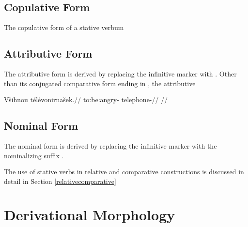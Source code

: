 \xe

\subsection{Copulative Form}
The copulative form of a stative verbum

\subsection{Attributive Form}
The attributive form is derived by replacing the infinitive marker  with . Other than its conjugated comparative form ending in , the attributive

\ex
\begingl
\gla V\v{s}ihnou t\'el\'evonirna\v{s}ek.//
\glb to:be:angry- telephone-//
\glft {}//
\endgl

\xe


\subsection{Nominal Form}
The nominal form is derived by replacing the infinitive marker  with the nominalizing suffix .




The use of stative verbs in relative and comparative constructions is discussed in detail in Section \ref{relativecomparative}
\section{Derivational Morphology}
